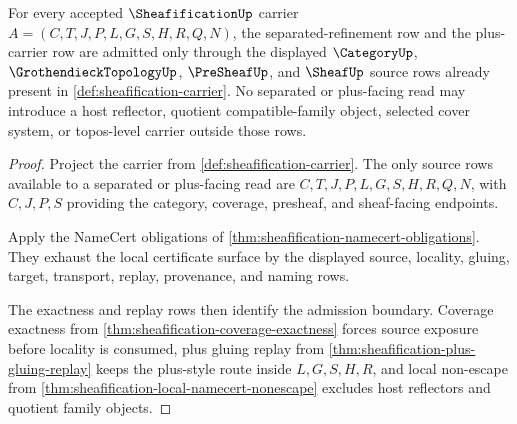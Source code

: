 \begin{theorem}
\label{thm:sheafification-separated-plus-carrier-obligation}
For every accepted $\SheafificationUp$ carrier $A=(C,T,J,P,L,G,S,H,R,Q,N)$, the separated-refinement row and the plus-carrier row are admitted only through the displayed $\CategoryUp$, $\GrothendieckTopologyUp$, $\PreSheafUp$, and $\SheafUp$ source rows already present in \autoref{def:sheafification-carrier}. No separated or plus-facing read may introduce a host reflector, quotient compatible-family object, selected cover system, or topos-level carrier outside those rows.
\end{theorem}
\begin{proof}
Project the carrier from \autoref{def:sheafification-carrier}. The only source rows available to a separated or plus-facing read are $C,T,J,P,L,G,S,H,R,Q,N$, with $C,J,P,S$ providing the category, coverage, presheaf, and sheaf-facing endpoints.

Apply the NameCert obligations of \autoref{thm:sheafification-namecert-obligations}. They exhaust the local certificate surface by the displayed source, locality, gluing, target, transport, replay, provenance, and naming rows.

The exactness and replay rows then identify the admission boundary. Coverage exactness from \autoref{thm:sheafification-coverage-exactness} forces source exposure before locality is consumed, plus gluing replay from \autoref{thm:sheafification-plus-gluing-replay} keeps the plus-style route inside $L,G,S,H,R$, and local non-escape from \autoref{thm:sheafification-local-namecert-nonescape} excludes host reflectors and quotient family objects.
\end{proof}

